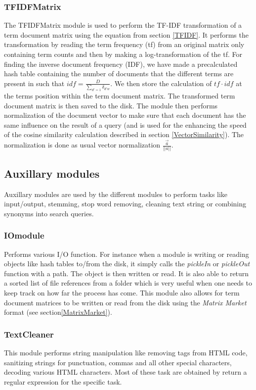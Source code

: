 \subsubsection{TFIDFMatrix}
The TFIDFMatrix module is used to perform the TF-IDF transformation of
a term document matrix using the equation from section \ref{TFIDF}. It
performs the transformation by reading the term frequency (tf) from an
original matrix only containing term counts and then by making a
log-transformation of the tf. For finding the inverse document
frequency (IDF), we have made a precalculated hash table containing
the number of documents that the different terms are present in such
that $\mathit{idf} = \frac{D}{\sum_{d\prime = 1}\delta_{d\prime
    w}}$. We then store the calculation of $\mathit{tf} \cdot
\mathit{idf}$ at the terms position within the term document
matrix. The transformed term document matrix is then saved to the
disk. The module then performs normalization of the document vector to
make sure that each document has the same influence on the result of a
query (and is used for the enhancing the speed of the cosine
similarity calculation described in section
\ref{VectorSimilarity}). The normalization is done as usual vector
normalization $\frac{\overrightarrow{a}}{||a||}$.

\subsection{Auxillary modules\label{AuxModules}}

Auxillary modules are used by the different modules to perform tasks
like input/output, stemming, stop word removing, cleaning text string
or combining synonyms into search queries.

\subsubsection{IOmodule}
Performs various I/O function. For instance when a module is writing
or reading objects like hash tables to/from the disk, it simply calls
the \textit{pickleIn} or \textit{pickleOut} function with a path. The
object is then written or read. It is also able to return a sorted
list of file references from a folder which is very useful when one
needs to keep track on how far the process has come. This module also
allows for term document matrices to be written or read from the disk
using the \textit{Matrix Market} format (see section\ref{MatrixMarket}).

\subsubsection{TextCleaner}
This module performs string manipulation like removing tags from HTML
code, sanitizing strings for punctuation, commas and all other special
characters, decoding various HTML characters. Most of these task are
obtained by return a regular expression for the specific task.

